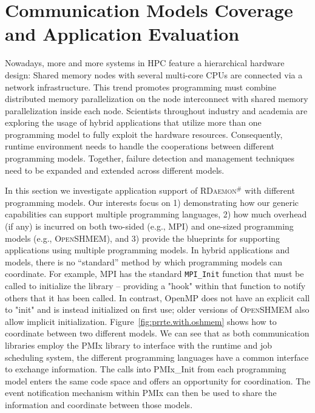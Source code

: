 \documentclass[5p,times,twocolumn]{elsarticle}
\newcommand{\mpifunc}[1]{\lstinline"MPI_#1"\xspace}
\newcommand{\mpi}[0]{\textsc{MPI}\xspace}
\newcommand{\oshmem}[0]{\textsc{OpenSHMEM}\xspace}
\newcommand{\ourwork}[0]{\textsc{RDaemon}\ensuremath{^\#}\xspace}
\begin{document}
\section{Communication Models Coverage and Application Evaluation}\label{sec:application}
Nowadays, more and more systems in HPC feature a hierarchical hardware design: Shared memory nodes
with several multi-core CPUs are connected via a network infrastructure. This trend promotes programming
must combine distributed memory parallelization on the node interconnect with shared memory parallelization
inside each node. Scientists throughout industry and academia are exploring the usage of hybrid applications
that utilize more than one programming model to fully exploit the hardware resources. Consequently,
runtime environment needs to handle the cooperations between different programming models. Together,
failure detection and management techniques need to be expanded and extended across different models.

In this section we investigate application support of \ourwork with different programming models.
Our interests focus on 1) demonstrating how our generic capabilities can support multiple programming languages, 2) how much overhead (if any) is incurred on both two-sided (e.g., \mpi) and one-sized programming models (e.g., \oshmem), and 3) provide the blueprints for supporting applications using multiple programming models.
In hybrid applications and models, there is no ``standard'' method by which programming models can coordinate.
For example, \mpi has the standard \mpifunc{Init} function that must be called to initialize the
library – providing a "hook" within that function to notify others that it has been called.
In contrast, OpenMP does not have an explicit call to "init" and is instead initialized on first use; older versions of \oshmem also allow implicit initialization.
Figure~\ref{fig:prrte.with.oshmem} shows how to coordinate between two different models. We can see
that as both communication libraries employ the PMIx library to interface with the runtime and job scheduling system,
the different programming languages have a common interface to exchange information.
The calls into PMIx\_Init from each programming model enters the same code space and offers an opportunity for coordination.
The event notification mechanism within PMIx can then be used to share the information and coordinate between those models.
\end{document}

